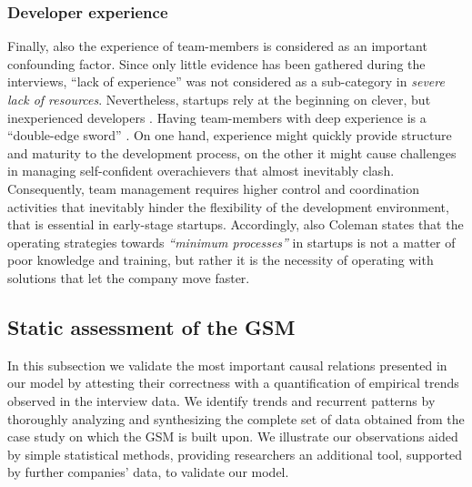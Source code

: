 \documentclass[10pt,journal,letterpaper,compsoc]{IEEEtran}
\begin{document}
\subsubsection{Developer experience} 
Finally, also the experience of team-members is considered as an important 
confounding factor. Since only little evidence has been gathered during the 
interviews, ``lack of experience'' was not considered as a sub-category in 
\textit{severe lack of resources}. Nevertheless, startups rely at the beginning 
on clever, but inexperienced developers \cite{Crowne2002}. Having team-members 
with deep experience is a ``double-edge sword'' \cite{Yoffie1999}. On one hand, 
experience might quickly provide structure and maturity to the development 
process, on the other it might cause challenges in managing self-confident 
overachievers that almost inevitably clash. Consequently, team management 
requires higher control and coordination activities that inevitably hinder the 
flexibility of the development environment, that is essential in early-stage 
startups. Accordingly, also Coleman \cite{Coleman2007,
Coleman2008a,Coleman2008} states that the operating strategies towards 
\textit{``minimum processes''} in startups is not a matter of poor knowledge and 
training, but rather it is the necessity of operating with solutions that let 
the company move faster.


\subsection{Static assessment of the GSM}
\label{sect:theory:validation:stats}

In this subsection we validate the most important causal relations presented in 
our model by attesting their correctness  with a quantification of empirical 
trends observed in the interview data. We identify trends and recurrent patterns 
by thoroughly analyzing and synthesizing the complete set of data obtained from 
the case study on which the GSM is built upon. We illustrate our observations 
aided by simple statistical methods, providing researchers an additional tool, 
supported by further companies' data, to validate our model.
\end{document}
